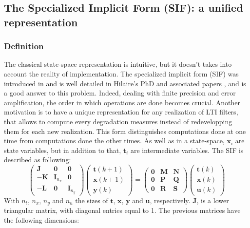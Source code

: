 	\subsection{The Specialized Implicit Form (SIF): a unified representation}
	\subsubsection{Definition}
	The classical state-space representation is intuitive, but it doesn't takes into account the reality of implementation.
	The specialized implicit form (SIF) was introduced in \cite{sifd} and is well detailed in Hilaire's PhD and associated papers \cite{hilaire,sif},
	and is a good answer to this problem.
	Indeed, dealing with finite precision and error amplification, the order in which operations are done becomes crucial.
	Another motivation is to have a unique representation for any realization of LTI filters,
	that allows to compute every degradation measures instead of redevelopping them for each new realization.
	This form distinguishes computations done at one time from computations done the other times. As well as
	in a state-space, $\boldsymbol{x}_i$ are state variables, but in addition to that, $\boldsymbol{t}_i$ are intermediate variables.
	The SIF is described as following:
	\begin{equation} \label{sifdef}
		\begin{pmatrix}
			\boldsymbol{J} & \boldsymbol{0} & \boldsymbol{0} \\
			\boldsymbol{-K} & \boldsymbol{I}_{n_x} & \boldsymbol{0} \\
			\boldsymbol{-L} & \boldsymbol{0} & \boldsymbol{I}_{n_y} 
		\end{pmatrix}
		\begin{pmatrix}
			\boldsymbol{t} (k+1)  \\
			\boldsymbol{x} (k+1)  \\
			\boldsymbol{y} (k) 
		\end{pmatrix}
		=
		\begin{pmatrix}
			\boldsymbol{0} & \boldsymbol{M} & \boldsymbol{N} \\
			\boldsymbol{0} & \boldsymbol{P} & \boldsymbol{Q} \\
			\boldsymbol{0} & \boldsymbol{R} & \boldsymbol{S} 
		\end{pmatrix}
		\begin{pmatrix}
			\boldsymbol{t} (k)  \\
			\boldsymbol{x} (k)  \\
			\boldsymbol{u} (k) 
		\end{pmatrix}
	\end{equation}
	With $n_t$, $n_x$, $n_y$ and $n_u$ the sizes of $\boldsymbol{t}$, $\boldsymbol{x}$, $\boldsymbol{y}$ and $\boldsymbol{u}$, respectively.
	$\boldsymbol{J}$, is a lower triangular matrix, with
	diagonal entries equal to 1.
	The previous matrices have the following dimensions:

